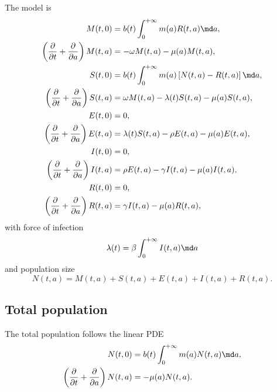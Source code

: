 \documentclass{jpmarticle}
\begin{document}
The model is
\begin{equation}
  \label{model_age_structured}
  \begin{split}
    M(t, 0)
    &= b(t) \int_0^{+\infty} m(a) R(t, a) \md a,
    \\
    \left(\frac{\partial}{\partial t}
      + \frac{\partial}{\partial a}\right)
    M(t, a)
    &= - \omega M(t, a) - \mu(a) M(t, a),
    \\
    S(t, 0)
    &= b(t) \int_0^{+\infty} m(a) \left[N(t, a) - R(t, a)\right] \md a,
    \\
    \left(\frac{\partial}{\partial t}
      + \frac{\partial}{\partial a}\right)
    S(t, a)
    &= \omega M(t, a) - \lambda(t) S(t, a) - \mu(a) S(t, a),
    \\
    E(t, 0)
    &= 0,
    \\
    \left(\frac{\partial}{\partial t}
      + \frac{\partial}{\partial a}\right)
    E(t, a)
    &= \lambda(t) S(t, a) - \rho E(t, a) - \mu(a) E(t, a),
    \\
    I(t, 0)
    &= 0,
    \\
    \left(\frac{\partial}{\partial t}
      + \frac{\partial}{\partial a}\right)
    I(t, a)
    &= \rho E(t, a) - \gamma I(t, a) - \mu(a) I(t, a),
    \\
    R(t, 0)
    &= 0,
    \\
    \left(\frac{\partial}{\partial t}
      + \frac{\partial}{\partial a}\right)
    R(t, a)
    &= \gamma I(t, a) - \mu(a) R(t, a),
  \end{split}
\end{equation}
with force of infection
\begin{equation}
  \lambda(t) = \beta \int_0^{+\infty} I(t, a) \md a
\end{equation}
and population size
\begin{equation}
  N(t, a) = M(t, a) + S(t, a) + E(t, a) + I(t, a) + R(t, a).
\end{equation}


\subsection{Total population}

The total population follows the linear PDE
\begin{equation}
  \begin{split}
    N(t, 0)
    &= b(t) \int_0^{+\infty} m(a) N(t, a) \md a,
    \\
    \left(\frac{\partial}{\partial t}
      + \frac{\partial}{\partial a}\right)
    N(t, a)
    &= - \mu(a) N(t, a).
  \end{split}
\end{equation}
\end{document}
